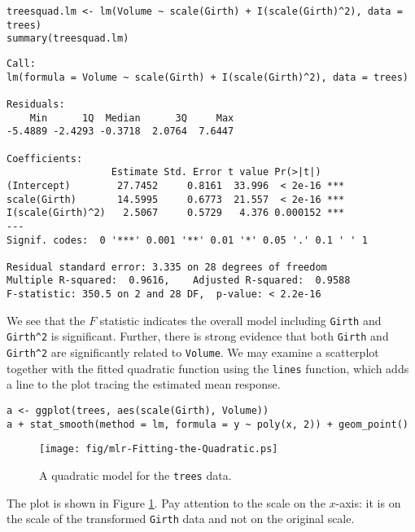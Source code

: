 \begin{verbatim}
treesquad.lm <- lm(Volume ~ scale(Girth) + I(scale(Girth)^2), data = trees)
summary(treesquad.lm)
\end{verbatim}

\begin{verbatim}
Call:
lm(formula = Volume ~ scale(Girth) + I(scale(Girth)^2), data = trees)

Residuals:
    Min      1Q  Median      3Q     Max 
-5.4889 -2.4293 -0.3718  2.0764  7.6447 

Coefficients:
                  Estimate Std. Error t value Pr(>|t|)    
(Intercept)        27.7452     0.8161  33.996  < 2e-16 ***
scale(Girth)       14.5995     0.6773  21.557  < 2e-16 ***
I(scale(Girth)^2)   2.5067     0.5729   4.376 0.000152 ***
---
Signif. codes:  0 '***' 0.001 '**' 0.01 '*' 0.05 '.' 0.1 ' ' 1

Residual standard error: 3.335 on 28 degrees of freedom
Multiple R-squared:  0.9616,	Adjusted R-squared:  0.9588 
F-statistic: 350.5 on 2 and 28 DF,  p-value: < 2.2e-16
\end{verbatim}

We see that the \(F\) statistic indicates the overall model including
\texttt{Girth} and \texttt{Girth\textasciicircum{}2} is significant. Further, there is strong
evidence that both \texttt{Girth} and \texttt{Girth\textasciicircum{}2} are significantly related to
\texttt{Volume}. We may examine a scatterplot together with the fitted
quadratic function using the \texttt{lines} function, which adds a line to
the plot tracing the estimated mean response.

\begin{verbatim}
a <- ggplot(trees, aes(scale(Girth), Volume))
a + stat_smooth(method = lm, formula = y ~ poly(x, 2)) + geom_point()
\end{verbatim}

\begin{figure}[ht!]
\centering
\texttt{[image: fig/mlr-Fitting-the-Quadratic.ps]}
\caption[Quadratic model for the \texttt{trees} data]{\label{fig-Fitting-the-Quadratic}\small A quadratic model for the \texttt{trees} data.}
\end{figure}

The plot is shown in Figure \ref{fig-Fitting-the-Quadratic}. Pay attention to
the scale on the \(x\)-axis: it is on the scale of the transformed
\texttt{Girth} data and not on the original scale.




